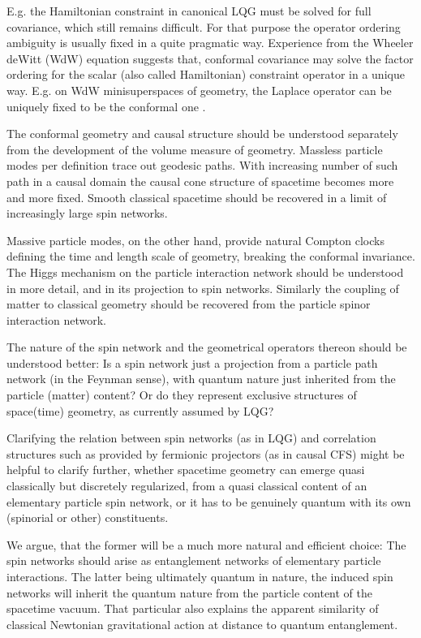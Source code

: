 \documentclass[11pt,a4paper]{article}
\theoremstyle{definition}
\begin{document}
	E.g. the Hamiltonian constraint in canonical LQG must be solved for full covariance, which still remains difficult. For that purpose the operator ordering ambiguity is usually fixed in a quite pragmatic way. 
	Experience from the Wheeler deWitt (WdW) equation suggests that, conformal covariance may solve the factor ordering for the scalar (also called Hamiltonian) constraint operator in a  unique way. E.g. on WdW minisuperspaces of geometry, the Laplace operator can be uniquely fixed to be the conformal one \cite{rainer1994conformal}.
	
	The conformal geometry and causal structure should be understood separately from the development of the volume measure of geometry. Massless particle modes per definition trace out geodesic paths. With increasing number of such path in a causal domain the causal cone structure of spacetime becomes more and more fixed.
	Smooth classical spacetime should be recovered in a limit of increasingly large spin networks. 
	
	Massive particle modes, on the other hand, provide natural Compton clocks defining the time and length scale of geometry, breaking the conformal invariance. 
	The Higgs mechanism on the particle interaction network should be understood in more detail, and in its projection to spin networks. Similarly the coupling of matter to classical geometry should be recovered from the particle spinor interaction network.
	
	The nature of the spin network and the geometrical operators thereon should be understood better: Is a spin network just a projection from a particle path network (in the Feynman sense), with quantum nature just inherited from the particle (matter) content? Or do they represent exclusive structures of space(time) geometry, as currently assumed by LQG?
	
	Clarifying the relation between spin networks (as in LQG) and correlation structures such as provided by fermionic projectors (as in causal CFS) might be helpful to clarify further, whether spacetime geometry can emerge quasi classically but discretely regularized, from a quasi classical content of an elementary particle spin network, or it has to be genuinely quantum with its own (spinorial or other) constituents. 
	
	We argue, that the former will be a much more natural and efficient choice: The spin networks should arise as entanglement networks of elementary particle interactions. The latter being ultimately quantum in nature, the induced spin networks will inherit the quantum nature from the particle content of the spacetime vacuum. That particular also explains the apparent similarity of classical Newtonian gravitational action at distance to quantum entanglement.
	
\end{document}
